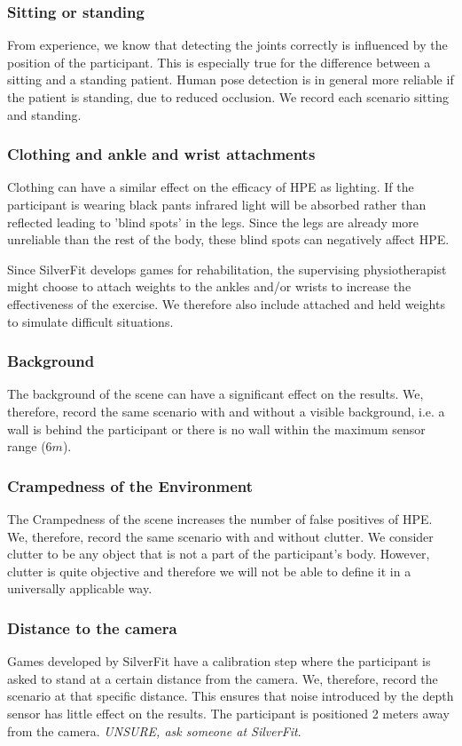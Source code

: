 \subsubsection{Sitting or standing}

From experience, we know that detecting the joints correctly is influenced by the position of the participant. This is especially true for the difference between a sitting and a standing patient. Human pose detection is in general more reliable if the patient is standing, due to reduced occlusion. We record each scenario sitting and standing.

\subsubsection{Clothing and ankle and wrist attachments}

Clothing can have a similar effect on the efficacy of HPE as lighting. If the participant is wearing black pants infrared light will be absorbed rather than reflected leading to 'blind spots' in the legs. Since the legs are already more unreliable than the rest of the body, these blind spots can negatively affect HPE. 

Since SilverFit develops games for rehabilitation, the supervising physiotherapist might choose to attach weights to the ankles and/or wrists to increase the effectiveness of the exercise. We therefore also include attached and held weights to simulate difficult situations.

\subsubsection{Background}

The background of the scene can have a significant effect on the results. We, therefore, record the same scenario with and without a visible background, i.e. a wall is behind the participant or there is no wall within the maximum sensor range ($6m$).

\subsubsection{Crampedness of the Environment}

The Crampedness of the scene increases the number of false positives of HPE. We, therefore, record the same scenario with and without clutter. We consider clutter to be any object that is not a part of the participant's body. However, clutter is quite objective and therefore we will not be able to define it in a universally applicable way. 

\subsubsection{Distance to the camera}

Games developed by SilverFit have a calibration step where the participant is asked to stand at a certain distance from the camera. We, therefore, record the scenario at that specific distance. This ensures that noise introduced by the depth sensor has little effect on the results. The participant is positioned 2 meters away from the camera. \textit{UNSURE, ask someone at SilverFit}.


